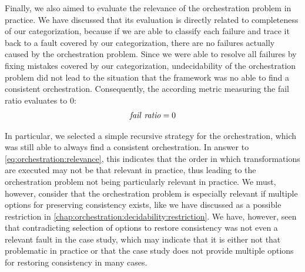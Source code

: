 

Finally, we also aimed to evaluate the relevance of the orchestration problem in practice.
We have discussed that its evaluation is directly related to completeness of our categorization, because if we are able to classify each failure and trace it back to a fault covered by our categorization, there are no failures actually caused by the orchestration problem.
Since we were able to resolve all failures by fixing mistakes covered by our categorization, undecidability of the orchestration problem did not lead to the situation that the \vitruv framework was no able to find a consistent orchestration.
Consequently, the according metric measuring the fail ratio evaluates to $0$:
\begin{align*}
    \mathit{fail\ ratio} = 0
\end{align*}

In particular, we selected a simple recursive strategy for the orchestration, which was still able to always find a consistent orchestration.
In answer to \autoref{eq:orchestration:relevance}, this indicates that the order in which transformations are executed may not be that relevant in practice, thus leading to the orchestration problem not being particularly relevant in practice.
We must, however, consider that the orchestration problem is especially relevant if multiple options for preserving consistency exists, like we have discussed as a possible restriction in \autoref{chap:orchestration:decidability:restriction}.
We have, however, seen that contradicting selection of options to restore consistency was not even a relevant fault in the case study, which may indicate that it is either not that problematic in practice or that the case study does not provide multiple options for restoring consistency in many cases.

